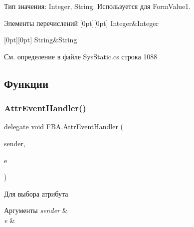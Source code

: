 Тип значения\+: Integer, String. Используется для Form\+Value1. 

\begin{DoxyEnumFields}{Элементы перечислений}
[0pt][0pt]{}\mbox{\label{namespace_f_b_a_a940b390561ecfbdb6e1606ec1711bd59aa0faef0851b4294c06f2b94bb1cb2044}} 
Integer&Integer \\
\hline

[0pt][0pt]{}\mbox{\label{namespace_f_b_a_a940b390561ecfbdb6e1606ec1711bd59a27118326006d3829667a400ad23d5d98}} 
String&String \\
\hline

\end{DoxyEnumFields}


См. определение в файле Sys\+Static.\+cs строка 1088



\subsection{Функции}
\mbox{\label{namespace_f_b_a_a0df7965ddd0519f1d83cbf05f2886d95}} 
\subsubsection{\texorpdfstring{Attr\+Event\+Handler()}{AttrEventHandler()}}
{\footnotesize\ttfamily delegate void F\+B\+A.\+Attr\+Event\+Handler (\begin{DoxyParamCaption}\item[{object}]{sender,  }\item[{\mbox{\hyperlink{class_f_b_a_1_1_select_attr_event_args}{Select\+Attr\+Event\+Args}}}]{e }\end{DoxyParamCaption})}



Для выбора атрибута 


\begin{DoxyParams}{Аргументы}
{\em sender} & \\
\hline
{\em e} & \\
\hline
\end{DoxyParams}
\mbox{\label{namespace_f_b_a_a05acb24d71f58b94b801674d2a8c5b17}} 
